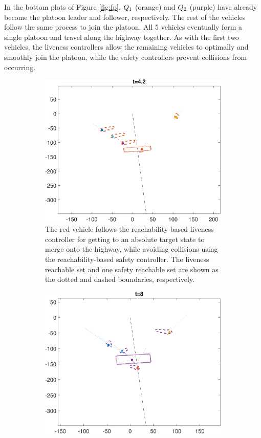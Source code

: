 In the bottom plots of Figure \ref{fig:fp}, $Q_{1}$ (orange) and $Q_{2}$ (purple) have already become the platoon leader and follower, respectively. The rest of the vehicles follow the same process to join the platoon. All 5 vehicles eventually form a single platoon and travel along the highway together. As with the first two vehicles, the liveness controllers allow the remaining vehicles to optimally and smoothly join the platoon, while the safety controllers prevent collisions from occurring.

\begin{figure} 
    \centering
    \begin{subfigure}[t]{0.45\textwidth} \label{subfig:fp_43}
        \includegraphics[width=\textwidth]{fig/fp_43}
        \caption{The red vehicle follows the reachability-based liveness controller for getting to an absolute target state to merge onto the highway, while avoiding collisions using the reachability-based safety controller. The liveness reachable set and one safety reachable set are shown as the dotted and dashed boundaries, respectively.}
    \end{subfigure}
    \begin{subfigure}[t]{0.45\textwidth} \label{subfig:fp_81}
        \includegraphics[width=\textwidth]{fig/fp_81}

\end{subfigure}
\end{figure}
